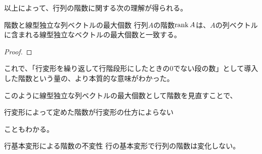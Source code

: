 \documentclass[../../../topic_linear-algebra]{subfiles}
\begin{document}
\br

以上によって、行列の階数に関する次の理解が得られる。

\begin{theorem}{階数と線型独立な列ベクトルの最大個数}\label{thm:rank-equals-max-indep-cols}
  行列$A$の階数$\rank A$は、$A$の列ベクトルに含まれる線型独立なベクトルの最大個数と一致する。
\end{theorem}

\begin{proof}
\end{proof}

\br

これで、「行変形を繰り返して行階段形にしたときの0でない段の数」として導入した階数という量の、より本質的な意味がわかった。

\br

このように線型独立な列ベクトルの最大個数として階数を見直すことで、
\begin{emphabox}
  \begin{spacebox}
    \begin{center}
      行変形によって定めた階数が行変形の仕方によらない
    \end{center}
  \end{spacebox}
\end{emphabox}
こともわかる。

\begin{theorem}{行基本変形による階数の不変性}
  行の基本変形で行列の階数は変化しない。
\end{theorem}
\end{document}
